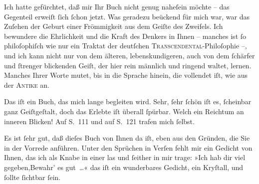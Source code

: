 \pstart
           Ich hatte gefürchtet, daß mir Ihr Buch nicht genug \introOben{}nahe\introOben{}{ }ſein
               möchte – das Gegenteil erweiſt{ }ſich{ }ſchon jetzt. Was geradezu beückend für {\pb}mich war, war das
               Zuſehen der Geburt einer Frömmigkeit aus dem Geiſte des Zweifels. Ich bewundere die
               Ehrlichkeit und die Kraft des Denkers in Ihnen – manches ist{ }ſo philoſophiſch wie nur
               ein Traktat der deutſchen \textsc{Transcendental}-Philoſophie –, und
               ich kann nicht \introOben{}nur\introOben{} von dem älteren, lebenskundigeren, auch
               von dem{ }ſchärfer und{ }ſtrenger blickenden Geiſt, der hier rein männlich und ringend
               waltet, lernen. Manches Ihrer Worte mutet, bis in die Sprache hinein, die vollendet
               iſt, wie aus der \textsc{Antike} an.\pend
           
\pstart
           Das iſt ein Buch, das mich
               lange begleiten wird. Sehr,{ }ſehr{ }ſchön iſt es,{ }ſcheinbar ganz Geiſtgeſtalt, doch das
               Erlebte iſt überall{ }ſpürbar. {\pb}Welch ein
               Reichtum an inneren Blicken! Auf S. 111 \label{K_L02494-1v}\label{K_L02494-1} und auf
               S. 121 \label{K_L02494-2v}\label{K_L02494-2} trafen mich{ }ſelbst.\pend
           
\pstart
           Es ist{ }ſehr gut, daß dieſes Buch von Ihnen da iſt, eben aus den Gründen, die Sie in
               der Vorrede anführen. Unter den Sprüchen in Verſen fehlt mir ein Gedicht von Ihnen,
               das ich als Knabe in einer \label{K_L02494-3v}\label{K_L02494-3} las und{ }ſeither in mir trage:\pend
           \stanza{}»Ich hab dir viel gegeben,\newverse{}Bewahr’ es gut {\dots}«\stanzaend{}
\pstart
           das iſt ein wunderbares Gedicht, ein Kryſtall, und{ }ſollte{ }ſichtbar{ }ſein.\pend
           
